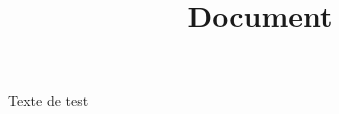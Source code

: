 \documentclass{beamer}
\begin{document}
Texte de test\title{ Document }





\frame{\titlepage}
\end{document}
